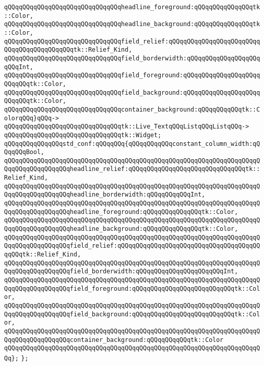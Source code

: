 \verb|qQQqqQQqqQQqqQQqqQQqqQQqqQQqqQQqheadline_foreground:qQQqqQQqqQQqqQQqtk::Color,|\newline
\verb|qQQqqQQqqQQqqQQqqQQqqQQqqQQqqQQqheadline_background:qQQqqQQqqQQqqQQqtk::Color,|\newline
\verb|qQQqqQQqqQQqqQQqqQQqqQQqqQQqqQQqfield_relief:qQQqqQQqqQQqqQQqqQQqqQQqqQQqqQQqqQQqqQQqqQQqtk::Relief_Kind,|\newline
\verb|qQQqqQQqqQQqqQQqqQQqqQQqqQQqqQQqfield_borderwidth:qQQqqQQqqQQqqQQqqQQqqQQqInt,|\newline
\verb|qQQqqQQqqQQqqQQqqQQqqQQqqQQqqQQqfield_foreground:qQQqqQQqqQQqqQQqqQQqqQQqqQQqtk::Color,|\newline
\verb|qQQqqQQqqQQqqQQqqQQqqQQqqQQqqQQqfield_background:qQQqqQQqqQQqqQQqqQQqqQQqqQQqtk::Color,|\newline
\verb|qQQqqQQqqQQqqQQqqQQqqQQqqQQqqQQqcontainer_background:qQQqqQQqqQQqtk::ColorqQQq}qQQq->|\newline
\verb|qQQqqQQqqQQqqQQqqQQqqQQqqQQqqQQqtk::Live_TextqQQqListqQQqListqQQq->|\newline
\verb|qQQqqQQqqQQqqQQqqQQqqQQqqQQqqQQqtk::Widget;|\newline
\newline
\verb|qQQqqQQqqQQqqQQqstd_conf:qQQqqQQq{qQQqqQQqqQQqconstant_column_width:qQQqqQQqBool,|\newline
\verb|qQQqqQQqqQQqqQQqqQQqqQQqqQQqqQQqqQQqqQQqqQQqqQQqqQQqqQQqqQQqqQQqqQQqqQQqqQQqqQQqqQQqqQQqheadline_relief:qQQqqQQqqQQqqQQqqQQqqQQqqQQqqQQqtk::Relief_Kind,|\newline
\verb|qQQqqQQqqQQqqQQqqQQqqQQqqQQqqQQqqQQqqQQqqQQqqQQqqQQqqQQqqQQqqQQqqQQqqQQqqQQqqQQqqQQqqQQqheadline_borderwidth:qQQqqQQqqQQqInt,|\newline
\verb|qQQqqQQqqQQqqQQqqQQqqQQqqQQqqQQqqQQqqQQqqQQqqQQqqQQqqQQqqQQqqQQqqQQqqQQqqQQqqQQqqQQqqQQqheadline_foreground:qQQqqQQqqQQqqQQqtk::Color,|\newline
\verb|qQQqqQQqqQQqqQQqqQQqqQQqqQQqqQQqqQQqqQQqqQQqqQQqqQQqqQQqqQQqqQQqqQQqqQQqqQQqqQQqqQQqqQQqheadline_background:qQQqqQQqqQQqqQQqtk::Color,|\newline
\verb|qQQqqQQqqQQqqQQqqQQqqQQqqQQqqQQqqQQqqQQqqQQqqQQqqQQqqQQqqQQqqQQqqQQqqQQqqQQqqQQqqQQqqQQqfield_relief:qQQqqQQqqQQqqQQqqQQqqQQqqQQqqQQqqQQqqQQqqQQqtk::Relief_Kind,|\newline
\verb|qQQqqQQqqQQqqQQqqQQqqQQqqQQqqQQqqQQqqQQqqQQqqQQqqQQqqQQqqQQqqQQqqQQqqQQqqQQqqQQqqQQqqQQqfield_borderwidth:qQQqqQQqqQQqqQQqqQQqqQQqInt,|\newline
\verb|qQQqqQQqqQQqqQQqqQQqqQQqqQQqqQQqqQQqqQQqqQQqqQQqqQQqqQQqqQQqqQQqqQQqqQQqqQQqqQQqqQQqqQQqfield_foreground:qQQqqQQqqQQqqQQqqQQqqQQqqQQqtk::Color,|\newline
\verb|qQQqqQQqqQQqqQQqqQQqqQQqqQQqqQQqqQQqqQQqqQQqqQQqqQQqqQQqqQQqqQQqqQQqqQQqqQQqqQQqqQQqqQQqfield_background:qQQqqQQqqQQqqQQqqQQqqQQqqQQqtk::Color,|\newline
\verb|qQQqqQQqqQQqqQQqqQQqqQQqqQQqqQQqqQQqqQQqqQQqqQQqqQQqqQQqqQQqqQQqqQQqqQQqqQQqqQQqqQQqqQQqcontainer_background:qQQqqQQqqQQqtk::Color|\newline
\verb|qQQqqQQqqQQqqQQqqQQqqQQqqQQqqQQqqQQqqQQqqQQqqQQqqQQqqQQqqQQqqQQqqQQqqQQq};|\newline
\verb|};|\newline

